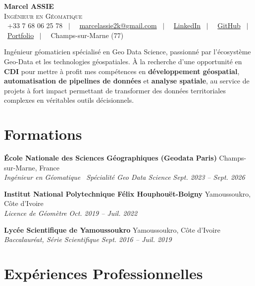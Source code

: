 \documentclass[11pt, a4paper]{article}
\newcommand{\cventry}[4]{
    \vspace{0.1cm}
    \noindent \textbf{#1} \hfill #2 \\
    \noindent \textit{#3} \hfill \textit{#4} \par
    \vspace{0.05cm}
}
\begin{document}
\pagestyle{empty}



\begin{center}
    {\Huge \textbf{Marcel ASSIE}} \\[0.2cm]
    {\Large \textsc{Ingénieur en Géomatique}} \\[0.3cm]
    \footnotesize
    \faMobile~+33 7 68 06 25 78
    ~$|$~
    \faEnvelope~\href{mailto:marcelassie2k@gmail.com}{marcelassie2k@gmail.com}
    ~$|$~
    \faLinkedinSquare~\href{https://www.linkedin.com/in/marcel-assie/}{LinkedIn}
    ~$|$~
    \faGithub~\href{https://github.com/MarcelAssie/}{GitHub}
    ~$|$~
    \faGlobe~\href{https://marcel-assie.dev}{Portfolio}
    ~$|$~
    \faMapMarker~Champs-sur-Marne (77)
\end{center}

\vspace{0.3cm}
\noindent Ingénieur géomaticien spécialisé en Geo Data Science, passionné par l'écosystème Geo-Data et les technologies géospatiales. À la recherche d'une opportunité en \textbf{CDI} pour mettre à profit mes compétences en \textbf{développement géospatial}, \textbf{automatisation de pipelines de données} et \textbf{analyse spatiale}, au service de projets à fort impact permettant de transformer des données territoriales complexes en véritables outils décisionnels.

\section*{Formations}

\cventry{École Nationale des Sciences Géographiques (Geodata Paris)}{Champs-sur-Marne, France}{Ingénieur en Géomatique \textbullet\ Spécialité Geo Data Science}{Sept. 2023 -- Sept. 2026}
\cventry{Institut National Polytechnique Félix Houphouët-Boigny}{Yamoussoukro, Côte d'Ivoire}{Licence de Géomètre}{Oct. 2019 -- Juil. 2022}
\cventry{Lycée Scientifique de Yamoussoukro}{Yamoussoukro, Côte d'Ivoire}{Baccalauréat, Série Scientifique}{Sept. 2016 -- Juil. 2019}

\section*{Expériences Professionnelles}
\end{document}
